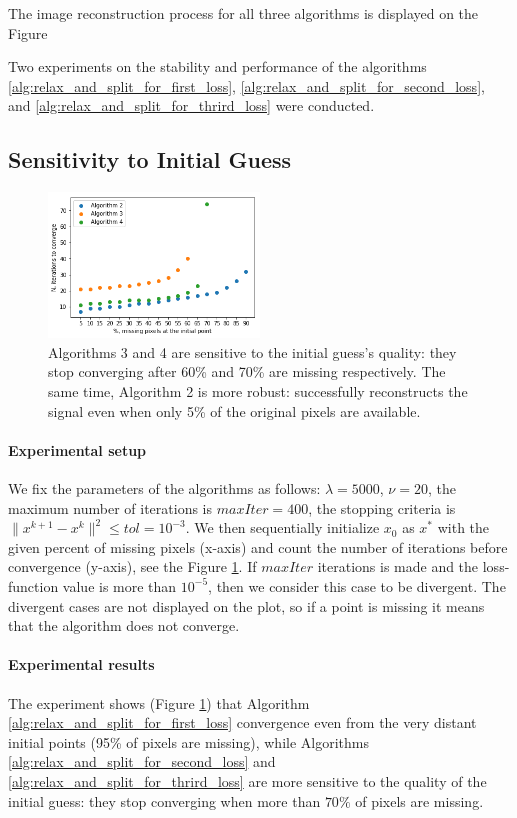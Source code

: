\documentclass[11pt,letterpaper]{article}
\numberwithin{equation}{section} %
\numberwithin{figure}{section} %
\numberwithin{table}{section} %
\begin{document}
The image reconstruction process for all three algorithms is displayed on the Figure

\label{sec:results}
Two experiments on the stability and performance of the algorithms \ref{alg:relax_and_split_for_first_loss}, \ref{alg:relax_and_split_for_second_loss}, and \ref{alg:relax_and_split_for_thrird_loss} were conducted.

\subsection{Sensitivity to Initial Guess}
\begin{figure}
    \centering
    \includegraphics[width=0.5\textwidth]{images/results_initial_conds}
    \caption{\label{fig:resits_init_conds} Algorithms 3 and 4 are sensitive to the initial guess's quality: they stop converging after 60\% and 70\% are missing respectively. The same time, Algorithm 2 is more robust: successfully reconstructs the signal even when only 5\% of the original pixels are available.}
\end{figure}
\paragraph{Experimental setup} We fix the parameters of the algorithms as follows: $\lambda = 5000$, $\nu = 20$, the maximum number of iterations is $maxIter = 400$, the stopping criteria is $\|x^{k+1} - x^{k}\|^2 \leq tol = 10^{-3}$. We then sequentially initialize $x_0$ as $x^*$ with the given percent of missing pixels (x-axis) and count the number of iterations before convergence (y-axis), see the Figure \ref{fig:resits_init_conds}. If $maxIter$ iterations is made and the loss-function value is more than $10^{-5}$, then we consider this case to be divergent. The divergent cases are not displayed on the plot, so if a point is missing it means that the algorithm does not converge.
\paragraph{Experimental results}
The experiment shows (Figure \ref{fig:resits_init_conds}) that Algorithm \ref{alg:relax_and_split_for_first_loss} convergence even from the very distant initial points (95\% of pixels are missing), while Algorithms \ref{alg:relax_and_split_for_second_loss} and \ref{alg:relax_and_split_for_thrird_loss} are more sensitive to the quality of the initial guess: they stop converging when more than $70\%$ of pixels are missing.
\end{document}
